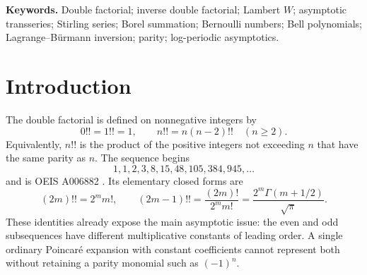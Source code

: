 \documentclass[11pt,a4paper,oneside]{article}
\theoremstyle{plain}
\theoremstyle{definition}
\theoremstyle{remark}
\newcommand{\DO}{\mathfrak D}
\begin{document}
\begin{abstract}
Finally, for the OEIS continuation
\[
 \DO(x)=2^{x/2}\Gamma\!\left(\frac{x}{2}+1\right)
 \left(\frac2\pi\right)^{(1-\cos\pi x)/4},
\]
the inverse has a leading log-periodic sector of order $1/\log T$, larger than
all inverse-power corrections.  We give its closed Fourier--Lagrange
coefficients and a second triangular recurrence that couples this periodic
sector to the Bernoulli grid.  Thus the ambiguity in ``the inverse double
factorial'' is resolved rather than hidden.
\end{abstract}

\noindent\textbf{Keywords.}
Double factorial; inverse double factorial; Lambert $W$; asymptotic
transseries; Stirling series; Borel summation; Bernoulli numbers; Bell
polynomials; Lagrange--B\"urmann inversion; parity; log-periodic asymptotics.

{\small\tableofcontents}
\clearpage

\section{Introduction}
\label{sec:intro}

The double factorial is defined on nonnegative integers by
\begin{equation}
 0!!=1!!=1,\qquad n!!=n(n-2)!!\quad(n\ge2).
 \label{eq:sequence-def}
\end{equation}
Equivalently, $n!!$ is the product of the positive integers not exceeding $n$
that have the same parity as $n$.  The sequence begins
\[
 1,1,2,3,8,15,48,105,384,945,\ldots
\]
and is OEIS A006882 \cite{OEIS}.  Its elementary closed forms are
\begin{equation}
 (2m)!!=2^m m!,
 \qquad
 (2m-1)!!=\frac{(2m)!}{2^m m!}
          =\frac{2^m\Gamma(m+1/2)}{\sqrt\pi}.
 \label{eq:parity-closed}
\end{equation}
These identities already expose the main asymptotic issue: the even and odd
subsequences have different multiplicative constants of leading order.  A
single ordinary Poincar\'e expansion with constant coefficients cannot represent
both without retaining a parity monomial such as $(-1)^n$.
\end{document}
